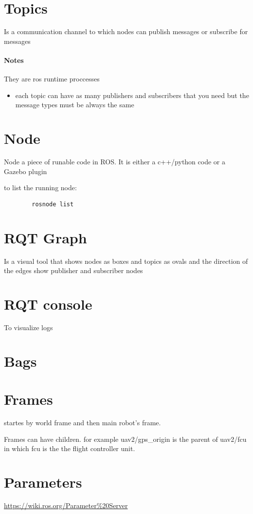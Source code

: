 \section{Topics}
    Is a communication channel to which nodes can publish messages or subscribe for messages

    \paragraph{Notes}
        They are ros runtime proccesses
        \begin{itemize}
            \item each topic can have as many publishers and subscribers that you need but the message types must be always the same
        \end{itemize}
\section{Node}
    Node a piece of runable code in ROS. It is either a c++/python code or a Gazebo plugin

    to list the running node:
    \begin{verbatim}
        rosnode list
    \end{verbatim}
\section{RQT Graph}
    Is a visual tool that shows nodes as boxes and topics as ovals and the direction of the edges show publisher and subscriber nodes
\section{RQT console}
    To visualize logs
\section{Bags}
\section{Frames}
     startes by world frame and then main robot's frame.
    
    Frames can have children. for example uav2/gps\_origin is the parent of uav2/fcu in which fcu is the the flight controller unit.
\section{Parameters}
    \url{https://wiki.ros.org/Parameter%20Server}
